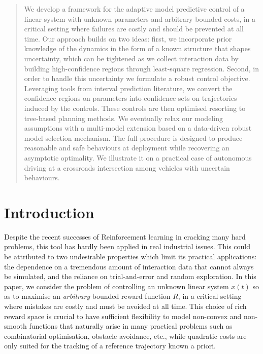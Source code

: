 \documentclass{article}
\begin{document}
\begin{abstract}
We develop a framework for the adaptive model predictive control of a linear system with unknown parameters and arbitrary bounded costs, in a critical setting where failures are costly and should be prevented at all time.  Our approach builds on two ideas: first, we incorporate prior knowledge of the dynamics in the form of a known structure that shapes uncertainty, which can be tightened as we collect interaction data by building high-confidence regions through least-square regression. Second, in order to handle this uncertainty we formulate a robust control objective. Leveraging tools from interval prediction literature, we convert the confidence regions on parameters into confidence sets on trajectories induced by the controls. These controls are then optimised resorting to tree-based planning methods. We eventually relax our modeling assumptions with a multi-model extension based on a data-driven robust model selection mechanism. The full procedure is designed to produce reasonable and safe behaviours at deployment while recovering an asymptotic optimality. We illustrate it on a practical case of autonomous driving at a crossroads intersection among vehicles with uncertain behaviours.
\end{abstract}	

\section{Introduction}

Despite the recent successes of Reinforcement learning in cracking many hard problems, this tool has hardly been applied in real industrial issues. This could be attributed to two undesirable properties which limit its practical applications: the dependence on a tremendous amount of interaction data that cannot always be simulated, and the reliance on trial-and-error and random exploration. In this paper, we consider the problem of controlling an unknown linear system $x(t)$ so as to maximise an \emph{arbitrary} bounded reward function $R$, in a critical setting where mistakes are costly and must be avoided at all time. 
This choice of rich reward space is crucial to have sufficient flexibility to model non-convex and non-smooth functions that naturally arise in many practical problems such as combinatorial optimisation, obstacle avoidance, etc., while quadratic costs are only suited for the tracking of a reference trajectory known a priori.
\end{document}
